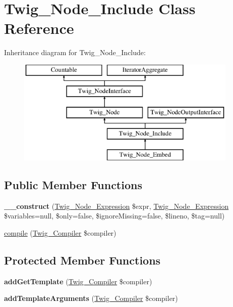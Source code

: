 \hypertarget{classTwig__Node__Include}{}\section{Twig\+\_\+\+Node\+\_\+\+Include Class Reference}
\label{classTwig__Node__Include}
Inheritance diagram for Twig\+\_\+\+Node\+\_\+\+Include\+:\begin{figure}[H]
\begin{center}
\leavevmode
\includegraphics[height=5.000000cm]{classTwig__Node__Include}
\end{center}
\end{figure}
\subsection*{Public Member Functions}
\begin{DoxyCompactItemize}
\item 
{\bfseries \+\_\+\+\_\+construct} (\hyperlink{classTwig__Node__Expression}{Twig\+\_\+\+Node\+\_\+\+Expression} \$expr, \hyperlink{classTwig__Node__Expression}{Twig\+\_\+\+Node\+\_\+\+Expression} \$variables=null, \$only=false, \$ignore\+Missing=false, \$lineno, \$tag=null)\hypertarget{classTwig__Node__Include_a05f58436ac9f0bf1765d535f4a046ef9}{}\label{classTwig__Node__Include_a05f58436ac9f0bf1765d535f4a046ef9}

\item 
\hyperlink{classTwig__Node__Include_a44452b655f081b2b7566278f42def29f}{compile} (\hyperlink{classTwig__Compiler}{Twig\+\_\+\+Compiler} \$compiler)
\end{DoxyCompactItemize}
\subsection*{Protected Member Functions}
\begin{DoxyCompactItemize}
\item 
{\bfseries add\+Get\+Template} (\hyperlink{classTwig__Compiler}{Twig\+\_\+\+Compiler} \$compiler)\hypertarget{classTwig__Node__Include_a7b9917ab590b6c8d12d801d725b319bc}{}\label{classTwig__Node__Include_a7b9917ab590b6c8d12d801d725b319bc}

\item 
{\bfseries add\+Template\+Arguments} (\hyperlink{classTwig__Compiler}{Twig\+\_\+\+Compiler} \$compiler)\hypertarget{classTwig__Node__Include_aeef4e1aa22b383a6fd077c36c872512a}{}\label{classTwig__Node__Include_aeef4e1aa22b383a6fd077c36c872512a}

\end{DoxyCompactItemize}
